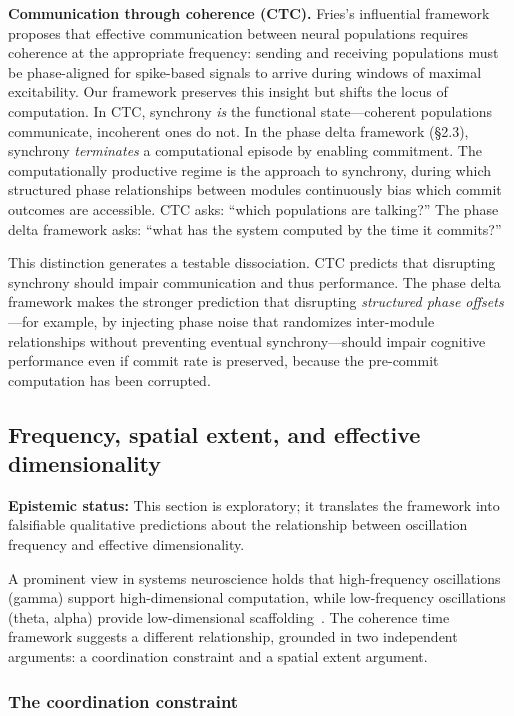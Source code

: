 \documentclass[12pt]{article}
\begin{document}
\textbf{Communication through coherence (CTC).} Fries's influential framework~\cite{fries2005,fries2015} proposes that effective communication between neural populations requires coherence at the appropriate frequency: sending and receiving populations must be phase-aligned for spike-based signals to arrive during windows of maximal excitability. Our framework preserves this insight but shifts the locus of computation. In CTC, synchrony \emph{is} the functional state---coherent populations communicate, incoherent ones do not. In the phase delta framework (\S2.3), synchrony \emph{terminates} a computational episode by enabling commitment. The computationally productive regime is the approach to synchrony, during which structured phase relationships between modules continuously bias which commit outcomes are accessible. CTC asks: ``which populations are talking?'' The phase delta framework asks: ``what has the system computed by the time it commits?''

This distinction generates a testable dissociation. CTC predicts that disrupting synchrony should impair communication and thus performance. The phase delta framework makes the stronger prediction that disrupting \emph{structured phase offsets}---for example, by injecting phase noise that randomizes inter-module relationships without preventing eventual synchrony---should impair cognitive performance even if commit rate is preserved, because the pre-commit computation has been corrupted.

\subsection{Frequency, spatial extent, and effective dimensionality}

\textbf{Epistemic status:} This section is exploratory; it translates the framework into falsifiable qualitative predictions about the relationship between oscillation frequency and effective dimensionality.

A prominent view in systems neuroscience holds that high-frequency oscillations (gamma)
support high-dimensional computation, while low-frequency oscillations (theta, alpha)
provide low-dimensional scaffolding~\cite{buzsaki2004,miller2018,lundqvist2016,pinotsis2023}.
The coherence time framework suggests a different relationship, grounded in two
independent arguments: a coordination constraint and a spatial extent argument.

\subsubsection{The coordination constraint}
\end{document}

